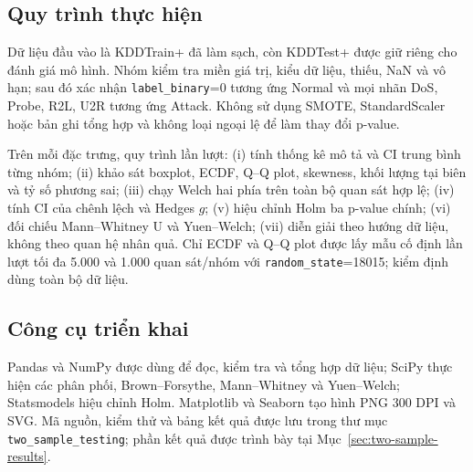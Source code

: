 \subsection{Quy trình thực hiện}
\label{subsec:two-sample-procedure}

Dữ liệu đầu vào là KDDTrain+ đã làm sạch, còn KDDTest+ được giữ riêng cho đánh giá mô
hình. Nhóm kiểm tra miền giá trị, kiểu dữ liệu, thiếu, NaN và vô hạn; sau đó xác nhận
\texttt{label\_binary}=0 tương ứng Normal và mọi nhãn DoS, Probe, R2L, U2R tương ứng
Attack. Không sử dụng SMOTE, StandardScaler hoặc bản ghi tổng hợp và không loại ngoại
lệ để làm thay đổi p-value.

Trên mỗi đặc trưng, quy trình lần lượt: (i) tính thống kê mô tả và CI trung bình từng
nhóm; (ii) khảo sát boxplot, ECDF, Q--Q plot, skewness, khối lượng tại biên và tỷ số
phương sai; (iii) chạy Welch hai phía trên toàn bộ quan sát hợp lệ; (iv) tính CI của
chênh lệch và Hedges $g$; (v) hiệu chỉnh Holm ba p-value chính; (vi) đối chiếu
Mann--Whitney U và Yuen--Welch; (vii) diễn giải theo hướng dữ liệu, không theo quan hệ
nhân quả. Chỉ ECDF và Q--Q plot được lấy mẫu cố định lần lượt tối đa 5.000 và 1.000
quan sát/nhóm với \texttt{random\_state}=18015; kiểm định dùng toàn bộ dữ liệu.

\subsection{Công cụ triển khai}
\label{subsec:two-sample-tools}

Pandas và NumPy được dùng để đọc, kiểm tra và tổng hợp dữ liệu; SciPy thực hiện các
phân phối, Brown--Forsythe, Mann--Whitney và Yuen--Welch; Statsmodels hiệu chỉnh Holm.
Matplotlib và Seaborn tạo hình PNG 300 DPI và SVG. Mã nguồn, kiểm thử và bảng kết quả
được lưu trong thư mục \texttt{two\_sample\_testing}; phần kết quả được trình bày tại
Mục~\ref{sec:two-sample-results}.


